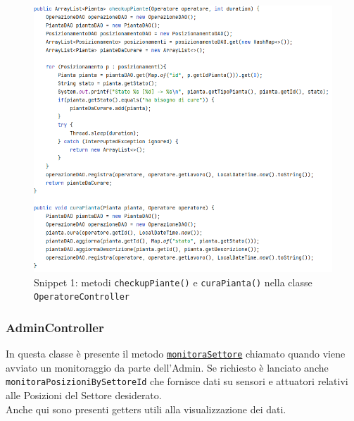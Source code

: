\documentclass{article}
\newcommand{\code}[1]{\texttt{#1}}
\begin{document}
\begin{figure}[H]
    \centering
    \includegraphics[scale=0.5]{resources/images/Snippets/snippet_checkuppiante_curapianta.png}
    \captionsetup{labelformat=empty, labelsep=none}
    \caption{Snippet 1: metodi \code{checkupPiante()} e \code{curaPianta()} nella classe \code{OperatoreController}}
    \label{fig:snippet_checkuppiante_curapianta}
\end{figure}

\subsubsection{AdminController}
In questa classe è presente il metodo \hyperref[fig:snippet_monitorasettore]{\code{monitoraSettore}} chiamato quando viene avviato un monitoraggio da parte dell'Admin. Se richiesto è lanciato anche \code{monitoraPosizioniBySettoreId} che fornisce dati su sensori e attuatori relativi alle Posizioni del Settore desiderato.\\
Anche qui sono presenti getters utili alla visualizzazione dei dati.
\end{document}
